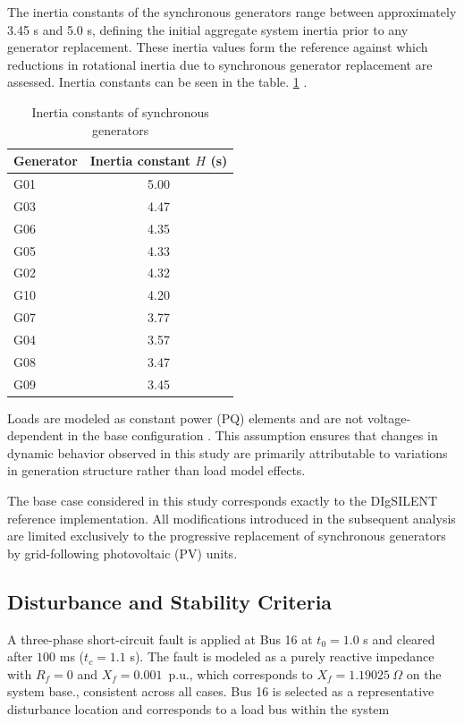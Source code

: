 The inertia constants of the synchronous generators range between approximately 3.45 s and 5.0 s, defining the initial aggregate system inertia prior to any generator replacement. These inertia values form the reference against which reductions in rotational inertia due to synchronous generator replacement are assessed. Inertia constants can be seen in the table. \ref{tab:inertia_constants of sg in the IEEE39} .
\begin{table}[htbp!]
    \centering
    \caption{Inertia constants of synchronous generators}
    \label{tab:inertia_constants of sg in the IEEE39}
    \begin{tabular}{lc}
    \toprule
    \textbf{Generator} & \textbf{Inertia constant $H$ (s)} \\
    \midrule
    G01 & 5.00 \\
    G03 & 4.47 \\
    G06 & 4.35 \\
    G05 & 4.33 \\
    G02 & 4.32 \\
    G10 & 4.20 \\
    G07 & 3.77 \\
    G04 & 3.57 \\
    G08 & 3.47 \\
    G09 & 3.45 \\
    \bottomrule
    \end{tabular}
    \end{table}

Loads are modeled as constant power (PQ) elements and are not voltage-dependent in the base configuration \cite{DIgSILENT_IEEE39}. This assumption ensures that changes in dynamic behavior observed in this study are primarily attributable to variations in generation structure rather than load model effects.

The base case considered in this study corresponds exactly to the DIgSILENT reference implementation. All modifications introduced in the subsequent analysis are limited exclusively to the progressive replacement of synchronous generators by grid-following photovoltaic (PV) units.

\subsection{Disturbance and Stability Criteria}

A three-phase short-circuit fault is applied at Bus 16 at $t_0 = 1.0$ s and cleared after $100$ ms ($t_c = 1.1$ s). The fault is modeled as a purely reactive impedance with $R_f = 0$ and $X_f = 0.001$~p.u., which corresponds to $X_f = 1.19025~\Omega$ on the system base., consistent across all cases. Bus 16 is selected as a representative disturbance location and corresponds to a load bus within the system

